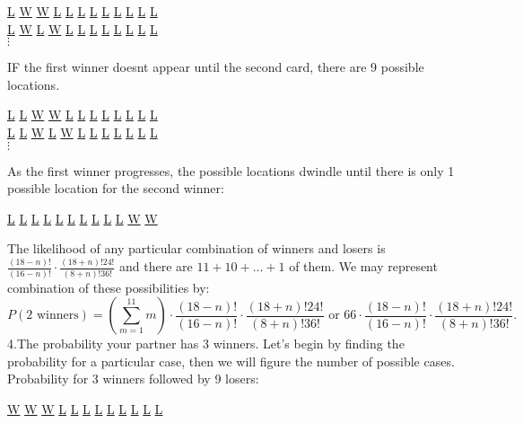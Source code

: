 \documentclass[11pt]{article}
\begin{document}
\begin {center}
  \underline{L} \underline{W} \underline{W} \underline{L} \underline{L} \underline{L} \underline{L} \underline{L} \underline{L} \underline{L} \underline{L} \underline{L}\\
\underline{L} \underline{W} \underline{L} \underline{W} \underline{L} \underline{L} \underline{L} \underline{L} \underline{L} \underline{L} \underline{L} \underline{L}\\
$\vdots$
  \end{center}
IF the first winner doesnt appear until the second card, there are 9 possible locations.
\begin {center}
  \underline{L} \underline{L} \underline{W} \underline{W} \underline{L} \underline{L} \underline{L} \underline{L} \underline{L} \underline{L} \underline{L} \underline{L}\\
\underline{L} \underline{L} \underline{W} \underline{L} \underline{W} \underline{L} \underline{L} \underline{L} \underline{L} \underline{L} \underline{L} \underline{L}\\
$\vdots$
  \end{center}
As the first winner progresses, the possible locations dwindle until there is only 1 possible location for the second winner:
\begin {center}
  \underline{L} \underline{L} \underline{L} \underline{L} \underline{L} \underline{L} \underline{L} \underline{L} \underline{L} \underline{L} \underline{W} \underline{W}\\
  \end{center}
The likelihood of any particular combination of winners and losers is $\frac{(18-n)!}{(16-n)!}\cdot \frac{(18+n)!24!}{(8+n)!36!}$ and there are $11+10+...+1$ of them. We may represent combination of these possibilities by:
\begin{equation}
P(2\text{ winners})= \left( \displaystyle\sum_{m=1}^{11} m \right) \cdot \frac{(18-n)!}{(16-n)!}\cdot \frac{(18+n)!24!}{(8+n)!36!} \text{ or } 66 \cdot \frac{(18-n)!}{(16-n)!}\cdot \frac{(18+n)!24!}{(8+n)!36!}.
\end{equation}
\indent 4.The probability your partner has 3 winners. Let's begin by finding the probability for a particular case, then we will figure the number of possible cases. Probability for 3 winners followed by 9 losers:
\begin {center}
  \underline{W} \underline{W} \underline{W} \underline{L} \underline{L} \underline{L} \underline{L} \underline{L} \underline{L} \underline{L} \underline{L} \underline{L}\\
  \end{center}
\end{document}
